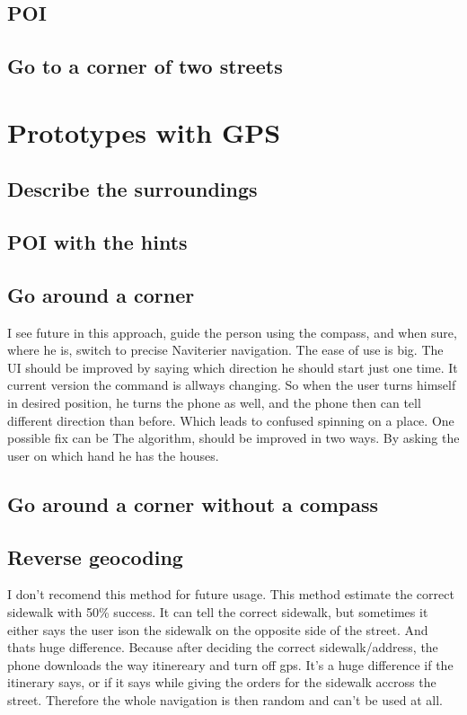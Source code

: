 \documentclass[11pt,oneside,a4paper]{book}
\begin{document}
			\subsection{POI}		
			\subsection{Go to a corner of two streets}					
			
		\section{Prototypes with GPS}
			\subsection{Describe the surroundings}
		
			\subsection{POI with the hints}
			\subsection{Go around a corner}
			I see future in this approach, guide the person using the compass, and when sure, where he is, switch to precise Naviterier navigation.
			The ease of use is big.
			The UI should be improved by saying which direction he should start just one time. It current version the command is allways changing. So when the user turns himself in desired position, he turns the phone as well, and the phone then can tell different direction than before. Which leads to confused spinning on a place. One possible fix can be 
			The algorithm, should be improved in two ways. By asking the user on which hand he has the houses.
			\subsection{Go around a corner without a compass}
				
			\subsection{Reverse geocoding}
				I don't recomend this method for future usage. This method estimate the correct sidewalk with 50\% success. It can tell the correct sidewalk, but sometimes it either says the user ison the sidewalk on the opposite side of the street.  And thats huge difference. 
				Because after deciding the correct sidewalk/address, the phone downloads the way itinereary and turn off gps. It's a huge difference if the itinerary says,  or if it says  while giving the orders for the sidewalk accross the street. Therefore the whole navigation is then random and can't be used at all.
				
\end{document}
